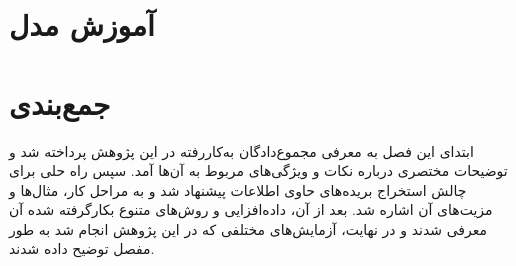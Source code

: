 







\section{آموزش مدل}\label{sec:آموزش مدل}



\section{جمع‌بندی}
ابتدای این فصل به معرفی مجموع‌دادگان به‌کاررفته در این پژوهش پرداخته شد و توضیحات مختصری درباره نکات و ویژگی‌های مربوط به آن‌ها آمد.
سپس راه حلی برای چالش استخراج بریده‌های حاوی اطلاعات پیشنهاد شد و به مراحل کار، مثال‌ها و مزیت‌های آن اشاره شد.
بعد از آن، داده‌افزایی و روش‌های متنوع بکارگرفته شده آن معرفی شدند و در نهایت، آزمایش‌های مختلفی که در این پژوهش انجام شد به طور مفصل توضیح  داده شدند.
